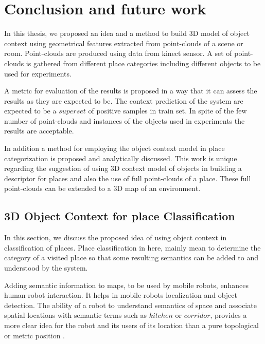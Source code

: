 \chapter{Conclusion and future work}
\label{Conclusion.ch}
In this thesis, we proposed an idea and a method to build 3D model of object context using geometrical features extracted
from point-clouds of a scene or room.
Point-clouds are produced using data from kinect sensor.
A set of point-clouds is gathered from different place categories including different objects to be used for experiments.

A metric for evaluation of the results is proposed in a way that it can assess the results as they are expected to be.
The context prediction of the system are expected to be a $superset$ of positive samples in train set.
In spite of the few number of point-clouds and instances of the objects used in experiments the results are acceptable. 

In addition a method for employing the object context model in place categorization is proposed and analytically discussed.
This work is unique regarding the suggestion of using 3D context model of objects in building a descriptor for places and also the use of full 
point-clouds of a place. 
These full point-clouds can be extended to a 3D map of an environment.

\section{3D Object Context for place Classification}
\label{3D Object Context for place Classification.sec}

In this section, we discuss the proposed idea of using object context in classification of places.
Place classification in here, mainly mean to determine the category of a visited place so that some resulting semantics 
can be added to and understood by the system.

Adding semantic information to maps, to be used by mobile robots, enhances human-robot interaction.
It helps in mobile robots localization and object detection.
The ability of a robot to understand semantics of space and associate spatial locations with semantic terms 
such as $kitchen$ or $corridor$, provides a more clear idea for the robot and its users of its location than a pure 
topological or metric position \cite{pronobis2011phd}.   

